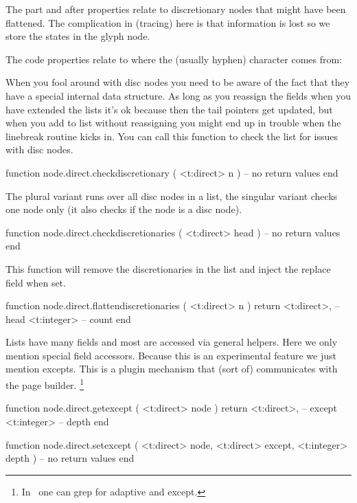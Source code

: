 The part and after properties relate to discretionary nodes that might have been
flattened. The complication in (tracing) here is that information is lost so we
store the states in the glyph node.


The code properties relate to where the (usually hyphen) character comes from:


When you fool around with disc nodes you need to be aware of the fact that they
have a special internal data structure. As long as you reassign the fields when
you have extended the lists it's ok because then the tail pointers get updated,
but when you add to list without reassigning you might end up in trouble when
the linebreak routine kicks in. You can call this function to check the list for
issues with disc nodes.

\starttyping[option=LUA]
function node.direct.checkdiscretionary ( <t:direct> n )
    -- no return values
end
\stoptyping

The plural variant runs over all disc nodes in a list, the singular variant
checks one node only (it also checks if the node is a disc node).

\starttyping[option=LUA]
function node.direct.checkdiscretionaries ( <t:direct> head )
    -- no return values
end
\stoptyping

This function will remove the discretionaries in the list and inject the replace
field when set.

\starttyping[option=LUA]
function node.direct.flattendiscretionaries ( <t:direct> n )
    return
        <t:direct>, -- head
        <t:integer> -- count
end
\stoptyping

\stopsubsection

\startsubsection[title={Boxes}]

Lists have many fields and most are accessed via general helpers. Here we only
mention special field accessors. Because this is an experimental feature we just
mention excepts. This is a plugin mechanism that (sort of) communicates with the
page builder. \footnote {In \CONTEXT\ one can grep for adaptive and except.}

\starttyping[option=LUA]
function node.direct.getexcept (
    <t:direct> node
)
    return
        <t:direct>, -- except
        <t:integer> -- depth
end

function node.direct.setexcept (
    <t:direct>  node,
    <t:direct>  except,
    <t:integer> depth
)
    -- no return values
end
\stoptyping

